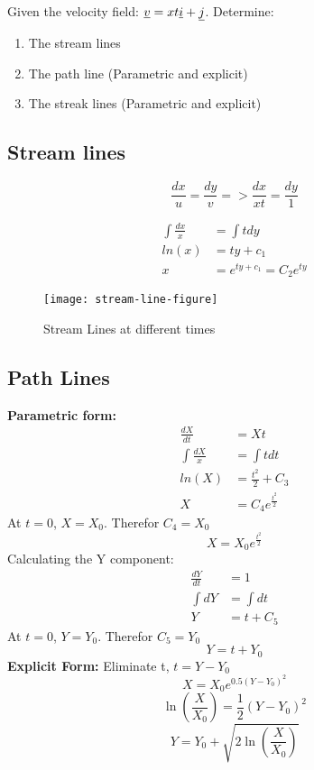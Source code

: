 \documentclass[../main.tex]{subfiles}
\begin{document}
	Given the velocity field: $\underline{v}=xt\underline{i} + \underline{j}$.
	Determine:
	\begin{enumerate}
		\item The stream lines
		\item The path line (Parametric and explicit)
		\item The streak lines (Parametric and explicit)
	\end{enumerate}

	\subsection{Stream lines}
	\begin{equation*}
		\frac{dx}{u} = \frac{dy}{v} => \frac{dx}{xt} = \frac{dy}{1}
	\end{equation*}

	\begin{align*}
		\int \frac{dx}{x} &= \int t dy \\
		ln(x) &= ty + c_1 \\
		x &= e^{ty + c_1} = C_2 e^{ty}
	\end{align*}
	\begin{figure}[ht]
		\centering
		\texttt{[image: stream-line-figure]}

		\label{fig:stream}
		\caption{Stream Lines at different times}
	\end{figure}

	\subsection{Path Lines}
	\textbf{Parametric form:}
	\begin{align*}
		\frac{dX}{dt} &= Xt \\
		\int \frac{dX}{x} &= \int t dt \\
		ln(X) &= \frac{t^2}{2} + C_3 \\
		X &= C_4 e^{\frac{t^2}{2}}
	\end{align*}
	At $t=0$, $X=X_0$. Therefor $C_4 = X_0$
	\begin{equation}
		X = X_0 e^{\frac{t^2}{2}}
	\end{equation}
	Calculating the Y component:
	\begin{align*}
		\frac{dY}{dt} &= 1 \\
		\int dY &= \int dt \\
		Y &= t + C_5 
	\end{align*}
	At $t=0$, $Y=Y_0$. Therefor $C_5 = Y_0$
	\begin{equation}
		Y = t + Y_0
	\end{equation}
	\textbf{Explicit Form:}
	Eliminate t, $t=Y-Y_0$
	\begin{equation*}
		X = X_0 e^{0.5 (Y - Y_0)^2}
	\end{equation*}
	\begin{equation*}
		\ln(\frac{X}{X_0}) = \frac{1}{2} (Y-Y_0)^2
	\end{equation*}
	\begin{equation}
		Y = Y_0 + \sqrt{2 \ln(\frac{X}{X_0})}
	\end{equation}
\end{document}
